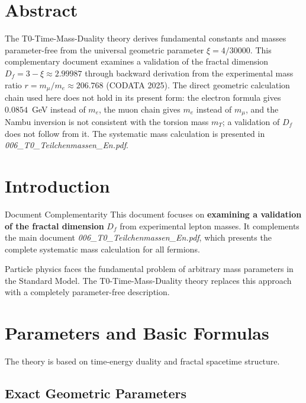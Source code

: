 \section*{Abstract}
		The T0-Time-Mass-Duality theory derives fundamental constants and masses parameter-free from the universal geometric parameter $\xi = 4/30000$. This complementary document examines a validation of the fractal dimension $D_f = 3 - \xi \approx 2.99987$ through backward derivation from the experimental mass ratio $r = m_{\mu} / m_e \approx 206.768$ (CODATA 2025). The direct geometric calculation chain used here does not hold in its present form: the electron formula gives $0.0854$~GeV instead of $m_e$, the muon chain gives $m_e$ instead of $m_\mu$, and the Nambu inversion is not consistent with the torsion mass $m_T$; a validation of $D_f$ does not follow from it. The systematic mass calculation is presented in \emph{006\_T0\_Teilchenmassen\_En.pdf}.

	
	
	
	\section{Introduction}
	\label{sec:introduction}
	
	\begin{important}{Document Complementarity}{}
		This document focuses on \textbf{examining a validation of the fractal dimension} $D_f$ from experimental lepton masses. It complements the main document \emph{006\_T0\_Teilchenmassen\_En.pdf}, which presents the complete systematic mass calculation for all fermions.
	\end{important}
	
	Particle physics faces the fundamental problem of arbitrary mass parameters in the Standard Model. The T0-Time-Mass-Duality theory replaces this approach with a completely parameter-free description.
	
	\section{Parameters and Basic Formulas}
	\label{sec:parameters}
	
	The theory is based on time-energy duality and fractal spacetime structure.
	
	\subsection{Exact Geometric Parameters}
	\label{subsec:exact_parameters}
	
